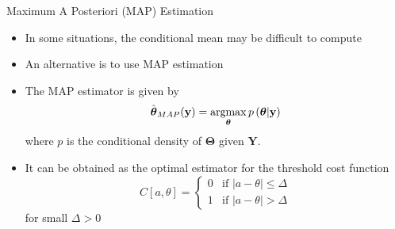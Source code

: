 \documentclass[t]{beamer}
\newcommand{\argmax}{\operatornamewithlimits{argmax}}
\begin{document}
\begin{frame}{Maximum A Posteriori (MAP) Estimation}
  \footnotesize
  \begin{itemize}
    \item \pause In some situations, the conditional mean may be difficult to compute
    \item \pause An alternative is to use MAP estimation
    \item \pause The MAP estimator is given by
      \begin{equation*}
        \hat{\boldsymbol{\theta}}_{MAP}(\mathbf{y}) = \argmax_{\boldsymbol{\theta}} p\left(\boldsymbol{\theta} | \mathbf{y}\right)
      \end{equation*}
      where $p$ is the conditional density of $\boldsymbol{\Theta}$ given $\mathbf{Y}$.
    \item \pause It can be obtained as the optimal estimator for the threshold cost function
      \begin{equation*}
        C[a,\theta] = \left\{ \begin{array}{cc} 
                                                              0 & \text{if } \lvert a - \theta \rvert \leq \Delta \\
                                                              1 & \text{if } \lvert a - \theta \rvert > \Delta
                                                             \end{array} \right. 
      \end{equation*}
      for small $\Delta > 0$
  \end{itemize}
  \normalsize
\end{frame}
\end{document}
